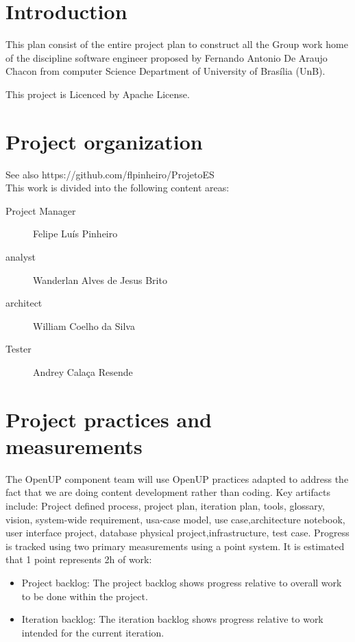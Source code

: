 \section*{Introduction}

This plan consist of the entire \gls{project plan} to construct all the Group work home of the  discipline \gls{software} engineer proposed by Fernando Antonio De Araujo Chacon from computer Science Department of University of Brasília (UnB).

This project is Licenced by Apache License.

\section*{Project organization}

See also https://github.com/flpinheiro/ProjetoES \\
This work is divided into the following content areas:\\
\begin{description}
	\item[\gls{Project Manager}] Felipe Luís Pinheiro
	\item[\gls{analyst}] Wanderlan Alves de Jesus Brito
	\item[\gls{architect}] William Coelho da Silva
	\item[Tester] Andrey Calaça Resende
\end{description}

\section*{Project practices and measurements}

The OpenUP component team will use OpenUP practices adapted to address the fact that we are doing content development rather than coding. Key artifacts include: Project defined process, \gls{project plan}, \gls{iteration} plan, tools, glossary, vision, system-wide \gls{requirement}, usa-case model, use case,\gls{architecture} notebook, user interface  project, database physical project,\gls{infrastructure}, \gls{test case}.
Progress is tracked using two primary measurements using a point system. It is estimated that 1 point represents 2h of work:
\begin{itemize}
	\item Project \gls{backlog}: The project backlog shows progress relative to overall work to be done within the project.
	\item Iteration backlog: The iteration backlog shows progress relative to work intended for the current iteration.
\end{itemize}

